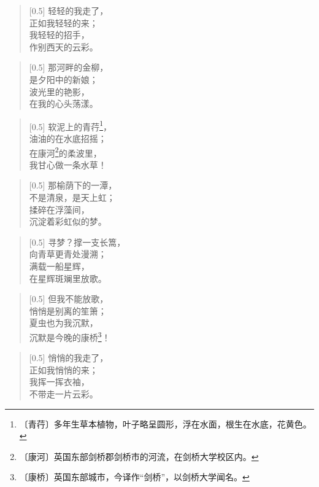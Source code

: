 \documentclass[12pt,UTF-8,openany]{ctexbook}
\begin{document}
\begin{normalsize}
    
    \begin{verse}[0.5\linewidth]
        轻轻的我走了， \\
        正如我轻轻的来； \\
        我轻轻的招手， \\
        作别西天的云彩。
    \end{verse}
    
    
    \begin{verse}[0.5\linewidth]
        那河畔的金柳， \\
        是夕阳中的新娘； \\
        波光里的艳影， \\
        在我的心头荡漾。
    \end{verse}
    
    
    \begin{verse}[0.5\linewidth]
        软泥上的青荇\footnote{〔青荇〕多年生草本植物，叶子略呈圆形，浮在水面，根生在水底，花黄色。}， \\
        油油的在水底招摇； \\
        在康河\footnote{〔康河〕英国东部剑桥郡剑桥市的河流，在剑桥大学校区内。}的柔波里， \\
        我甘心做一条水草！
    \end{verse}
    
    
    \begin{verse}[0.5\linewidth]
        那榆荫下的一潭， \\
        不是清泉，是天上虹； \\
        揉碎在浮藻间， \\
        沉淀着彩虹似的梦。
    \end{verse}
    
    
    \begin{verse}[0.5\linewidth]
        寻梦？撑一支长篙， \\
        向青草更青处漫溯； \\
        满载一船星辉， \\
        在星辉斑斓里放歌。
    \end{verse}
    
    
    \begin{verse}[0.5\linewidth]
        但我不能放歌， \\
        悄悄是别离的笙箫； \\
        夏虫也为我沉默， \\
        沉默是今晚的康桥\footnote{〔康桥〕英国东部城市，今译作“剑桥”，以剑桥大学闻名。}！
    \end{verse}
    
    
    \begin{verse}[0.5\linewidth]
        悄悄的我走了， \\
        正如我悄悄的来； \\
        我挥一挥衣袖， \\
        不带走一片云彩。
    \end{verse}
    
\end{normalsize}
\end{document}
